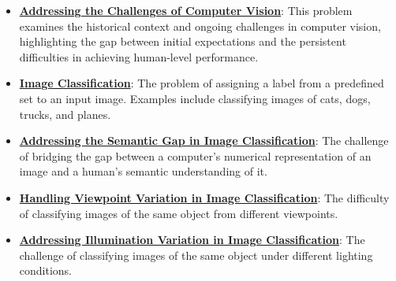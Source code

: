 \documentclass{article}%
\begin{document}
\begin{itemize}[leftmargin=*]%
\item \href{https://purdue.brightspace.com/d2l/common/assets/pdfjs-d2l-dist/1.0.14-legacy/web/viewer.html?file=\%2Fcontent\%2Fenforced\%2F1095467-wl.202510.CS.24300.001\%2F02L2-Intro.pdf\%3Fou\%3D1095467\&lang=en-us\&container=d2l-fileviewer-rendered-pdf\&fullscreen=d2l-fileviewer-rendered-pdf-dialog\&height=667#page=15}{\textbf{Addressing the Challenges of Computer Vision}}: This problem examines the historical context and ongoing challenges in computer vision, highlighting the gap between initial expectations and the persistent difficulties in achieving human-level performance.%
\item \href{https://purdue.brightspace.com/d2l/common/assets/pdfjs-d2l-dist/1.0.14-legacy/web/viewer.html?file=\%2Fcontent\%2Fenforced\%2F1095467-wl.202510.CS.24300.001\%2F07L2-Vision.pdf\%3Fou\%3D1095467\&lang=en-us\&container=d2l-fileviewer-rendered-pdf\&fullscreen=d2l-fileviewer-rendered-pdf-dialog\&height=667#page=3}{\textbf{Image Classification}}: The problem of assigning a label from a predefined set to an input image. Examples include classifying images of cats, dogs, trucks, and planes.%
\item \href{https://purdue.brightspace.com/d2l/common/assets/pdfjs-d2l-dist/1.0.14-legacy/web/viewer.html?file=\%2Fcontent\%2Fenforced\%2F1095467-wl.202510.CS.24300.001\%2F07L2-Vision.pdf\%3Fou\%3D1095467\&lang=en-us\&container=d2l-fileviewer-rendered-pdf\&fullscreen=d2l-fileviewer-rendered-pdf-dialog\&height=667#page=4}{\textbf{Addressing the Semantic Gap in Image Classification}}: The challenge of bridging the gap between a computer's numerical representation of an image and a human's semantic understanding of it.%
\item \href{https://purdue.brightspace.com/d2l/common/assets/pdfjs-d2l-dist/1.0.14-legacy/web/viewer.html?file=\%2Fcontent\%2Fenforced\%2F1095467-wl.202510.CS.24300.001\%2F07L2-Vision.pdf\%3Fou\%3D1095467\&lang=en-us\&container=d2l-fileviewer-rendered-pdf\&fullscreen=d2l-fileviewer-rendered-pdf-dialog\&height=667#page=6}{\textbf{Handling Viewpoint Variation in Image Classification}}: The difficulty of classifying images of the same object from different viewpoints.%
\item \href{https://purdue.brightspace.com/d2l/common/assets/pdfjs-d2l-dist/1.0.14-legacy/web/viewer.html?file=\%2Fcontent\%2Fenforced\%2F1095467-wl.202510.CS.24300.001\%2F07L2-Vision.pdf\%3Fou\%3D1095467\&lang=en-us\&container=d2l-fileviewer-rendered-pdf\&fullscreen=d2l-fileviewer-rendered-pdf-dialog\&height=667#page=7}{\textbf{Addressing Illumination Variation in Image Classification}}: The challenge of classifying images of the same object under different lighting conditions.%

\end{itemize}
\end{document}
